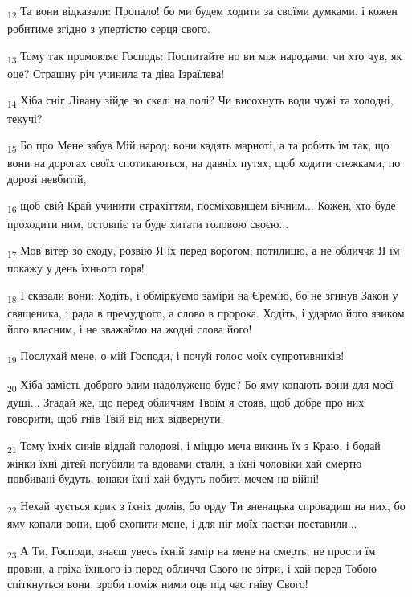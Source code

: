 \begin{tcolorbox}
\textsubscript{12} Та вони відказали: Пропало! бо ми будем ходити за своїми думками, і кожен робитиме згідно з упертістю серця свого.
\end{tcolorbox}
\begin{tcolorbox}
\textsubscript{13} Тому так промовляє Господь: Поспитайте но ви між народами, чи хто чув, як оце? Страшну річ учинила та діва Ізраїлева!
\end{tcolorbox}
\begin{tcolorbox}
\textsubscript{14} Хіба сніг Лівану зійде зо скелі на полі? Чи висохнуть води чужі та холодні, текучі?
\end{tcolorbox}
\begin{tcolorbox}
\textsubscript{15} Бо про Мене забув Мій народ: вони кадять марноті, а та робить їм так, що вони на дорогах своїх спотикаються, на давніх путях, щоб ходити стежками, по дорозі невбитій,
\end{tcolorbox}
\begin{tcolorbox}
\textsubscript{16} щоб свій Край учинити страхіттям, посміховищем вічним... Кожен, хто буде проходити ним, остовпіє та буде хитати головою своєю...
\end{tcolorbox}
\begin{tcolorbox}
\textsubscript{17} Мов вітер зо сходу, розвію Я їх перед ворогом; потилицю, а не обличчя Я їм покажу у день їхнього горя!
\end{tcolorbox}
\begin{tcolorbox}
\textsubscript{18} І сказали вони: Ходіть, і обміркуємо заміри на Єремію, бо не згинув Закон у священика, і рада в премудрого, а слово в пророка. Ходіть, і удармо його язиком його власним, і не зважаймо на жодні слова його!
\end{tcolorbox}
\begin{tcolorbox}
\textsubscript{19} Послухай мене, о мій Господи, і почуй голос моїх супротивників!
\end{tcolorbox}
\begin{tcolorbox}
\textsubscript{20} Хіба замість доброго злим надолужено буде? Бо яму копають вони для моєї душі... Згадай же, що перед обличчям Твоїм я стояв, щоб добре про них говорити, щоб гнів Твій від них відвернути!
\end{tcolorbox}
\begin{tcolorbox}
\textsubscript{21} Тому їхніх синів віддай голодові, і міццю меча викинь їх з Краю, і бодай жінки їхні дітей погубили та вдовами стали, а їхні чоловіки хай смертю повбивані будуть, юнаки їхні хай будуть побиті мечем на війні!
\end{tcolorbox}
\begin{tcolorbox}
\textsubscript{22} Нехай чується крик з їхніх домів, бо орду Ти зненацька спровадиш на них, бо яму копали вони, щоб схопити мене, і для ніг моїх пастки поставили...
\end{tcolorbox}
\begin{tcolorbox}
\textsubscript{23} А Ти, Господи, знаєш увесь їхній замір на мене на смерть, не прости їм провин, а гріха їхнього із-перед обличчя Свого не зітри, і хай перед Тобою спіткнуться вони, зроби поміж ними оце під час гніву Свого!
\end{tcolorbox}
